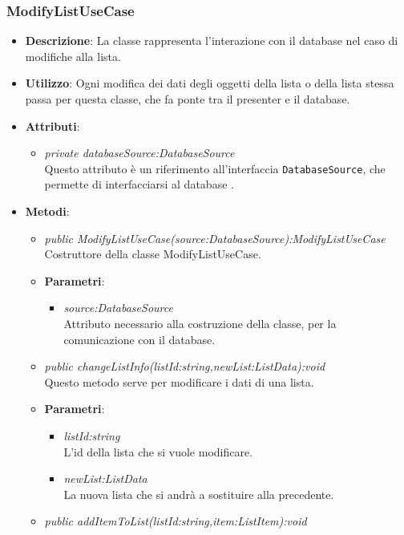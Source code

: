 \subsubsection{ModifyListUseCase}
\begin{itemize}
\item \textbf{Descrizione}: La classe rappresenta l'interazione con il database nel caso di modifiche alla lista.
\item \textbf{Utilizzo}: Ogni modifica dei dati degli oggetti della lista o della lista stessa passa per questa classe, che fa ponte tra il presenter e il database.
\item \textbf{Attributi}: 
	\begin{itemize}
	\item \textit{private databaseSource:DatabaseSource}\\
	Questo attributo è un riferimento all'interfaccia \texttt{DatabaseSource}, che permette di interfacciarsi al database .
	\end{itemize}
\item \textbf{Metodi}:
	\begin{itemize}
	\item \textit{public ModifyListUseCase(source:DatabaseSource):ModifyListUseCase}\\
	Costruttore della classe ModifyListUseCase.
			\item{\textbf{Parametri}: \begin{itemize}
			\item \textit{source:DatabaseSource}\\
			Attributo necessario alla costruzione della classe, per la comunicazione con  il database.
			\end{itemize}}
	\item \textit{public changeListInfo(listId:string,newList:ListData):void}\\
	Questo metodo serve per modificare i dati di una lista.
			\item{\textbf{Parametri}: \begin{itemize}
			\item \textit{listId:string}\\
			L'id della lista che si vuole modificare.
			\item \textit{newList:ListData}\\
			La nuova lista che si andrà a sostituire alla precedente.
			\end{itemize}}
	\item \textit{public addItemToList(listId:string,item:ListItem):void}\\

\end{itemize}
\end{itemize}
